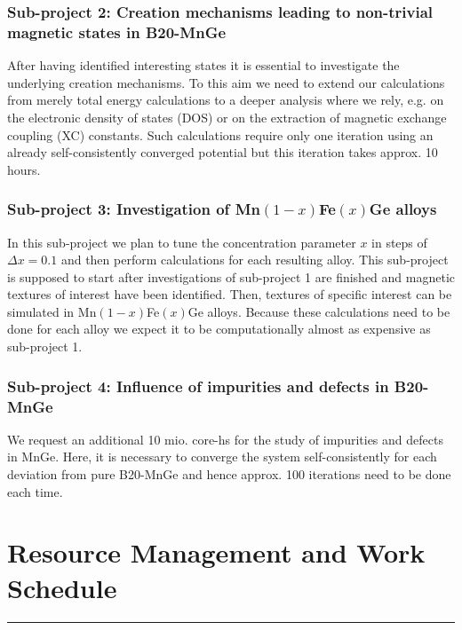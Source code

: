 \documentclass [a4paper, 12pt]{article}
\begin{document}
\subsubsection{Sub-project 2: Creation mechanisms leading to non-trivial magnetic states in B20-MnGe}
After having identified interesting states it is essential to investigate the underlying creation mechanisms.
To this aim we need to extend our calculations from merely total energy calculations to 
a deeper analysis where we rely, e.g. on the electronic density of states (DOS) or on the extraction
of magnetic exchange coupling (XC) constants. 
Such calculations require only one iteration using an already self-consistently converged potential but
this iteration takes approx. 10 hours.

\subsubsection{Sub-project 3: Investigation of Mn$(1-x)$Fe$(x)$Ge alloys}
In this sub-project we plan to tune the concentration parameter $x$ in steps of
$\Delta x = 0.1$ and then perform calculations for each resulting alloy. This
sub-project is supposed to start after investigations of sub-project 1 are finished
and magnetic textures of interest have been identified.
Then, textures of specific interest can be simulated in Mn$(1-x)$Fe$(x)$Ge alloys.
Because these calculations need to be done for each alloy we expect
it to be computationally almost as expensive as sub-project 1.

\subsubsection{Sub-project 4: Influence of impurities and defects in B20-MnGe}
We request an additional 10 mio. core-hs for the study of impurities and defects in MnGe.
Here, it is necessary to converge the system self-consistently for each
deviation from pure B20-MnGe and hence approx. 100 iterations need
to be done each time.




\section{Resource Management and Work Schedule}
\rule{\textwidth}{0.4pt}\\
\end{document}
